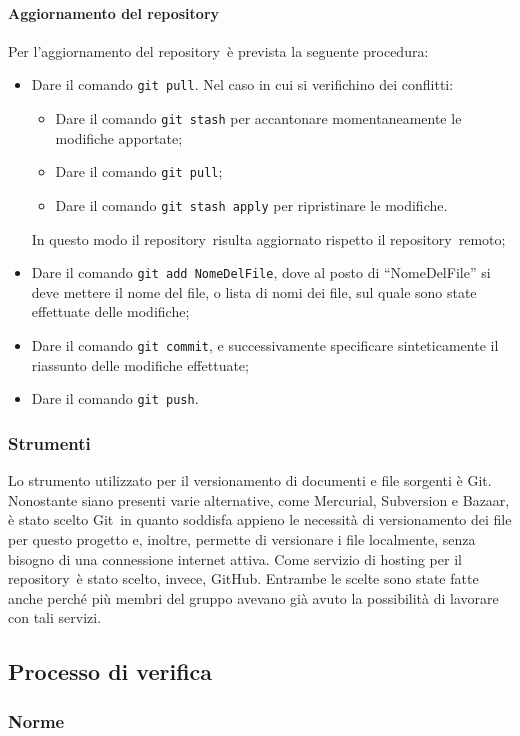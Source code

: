 \documentclass[../NormeProgetto.tex]{subfiles}
\begin{document}
	\paragraph{Aggiornamento del repository}
	Per l'aggiornamento del repository\g\ è prevista la seguente procedura:
	\begin{itemize}
		\item Dare il comando \texttt{git pull}. Nel caso in cui si verifichino dei conflitti:
			\begin{itemize}
			\item Dare il comando \texttt{git stash} per accantonare momentaneamente le modifiche apportate;
			\item Dare il comando \texttt{git pull};
			\item Dare il comando \texttt{git stash apply} per ripristinare le modifiche.
			\end{itemize}
		In questo modo il repository\g\ risulta aggiornato rispetto il repository\g\ 
remoto;
		\item Dare il comando \texttt{git add NomeDelFile}, dove al posto di ``NomeDelFile'' si deve mettere il nome del file, o lista di nomi dei file, sul quale sono state effettuate delle modifiche;
		\item Dare il comando \texttt{git commit}, e successivamente specificare sinteticamente il riassunto delle modifiche effettuate;
		\item Dare il comando \texttt{git push}.
	\end{itemize}	
	\subsubsection{Strumenti}
	Lo strumento utilizzato per il versionamento di documenti e file sorgenti è Git\g. Nonostante siano presenti varie alternative, come Mercurial, Subversion e Bazaar, è stato scelto Git\g\ in quanto soddisfa appieno le necessità di versionamento dei file per questo progetto e, inoltre, permette di versionare i file localmente, senza bisogno di una connessione internet attiva. Come servizio di hosting per il repository\g\ è stato scelto, invece, GitHub\g. Entrambe le scelte sono state fatte anche perché più membri del gruppo avevano già avuto la possibilità di lavorare con tali servizi.
	
	
\subsection{Processo di verifica}
	\subsubsection{Norme}
\end{document}
